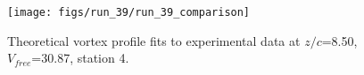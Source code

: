 \begin{figure}[H]
\centering
\texttt{[image: figs/run\_39/run\_39\_comparison]}
\caption{Theoretical vortex profile fits to experimental data at $z/c$=8.50, $V_{free}$=30.87, station 4.}
\label{fig:run_39_comparison}
\end{figure}


